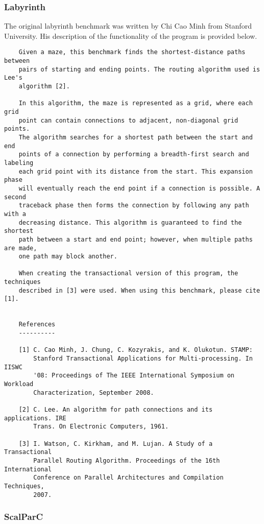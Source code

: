 \documentclass{article}
\begin{document}
\subsubsection{Labyrinth}

The original labyrinth benchmark was written by Chi Cao Minh from Stanford 
University. His description of the functionality of the program is provided 
below.

\begin{verbatim}
    Given a maze, this benchmark finds the shortest-distance paths between
    pairs of starting and ending points. The routing algorithm used is Lee's 
    algorithm [2].
 
    In this algorithm, the maze is represented as a grid, where each grid 
    point can contain connections to adjacent, non-diagonal grid points. 
    The algorithm searches for a shortest path between the start and end 
    points of a connection by performing a breadth-first search and labeling 
    each grid point with its distance from the start. This expansion phase 
    will eventually reach the end point if a connection is possible. A second 
    traceback phase then forms the connection by following any path with a 
    decreasing distance. This algorithm is guaranteed to find the shortest 
    path between a start and end point; however, when multiple paths are made, 
    one path may block another.

    When creating the transactional version of this program, the techniques
    described in [3] were used. When using this benchmark, please cite [1].


    References
    ----------

    [1] C. Cao Minh, J. Chung, C. Kozyrakis, and K. Olukotun. STAMP: 
        Stanford Transactional Applications for Multi-processing. In IISWC
        '08: Proceedings of The IEEE International Symposium on Workload 
        Characterization, September 2008. 

    [2] C. Lee. An algorithm for path connections and its applications. IRE 
        Trans. On Electronic Computers, 1961.

    [3] I. Watson, C. Kirkham, and M. Lujan. A Study of a Transactional 
        Parallel Routing Algorithm. Proceedings of the 16th International 
        Conference on Parallel Architectures and Compilation Techniques, 
        2007.
\end{verbatim}


\subsubsection{ScalParC}



\end{document}
